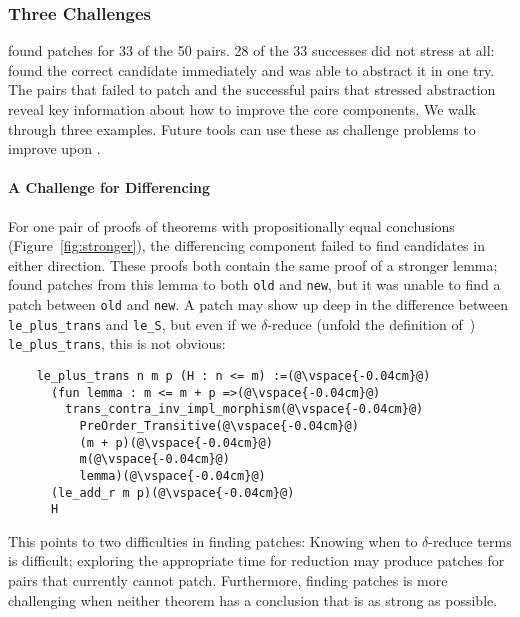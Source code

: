 \subsubsection{Three Challenges}
\label{sec:fail}

\sysname found patches for 33 of the 50 pairs. 28 of the 33 successes
did not stress \sysname at all: \sysname found the correct candidate immediately and was able to abstract it
in one try.
The pairs that \sysname failed to patch and the successful pairs that stressed abstraction
reveal key information about how to improve the core components.
We walk through three examples.
Future tools can use these as challenge problems to improve upon \sysname.

\paragraph{A Challenge for Differencing} For one pair of proofs of theorems 
with propositionally equal conclusions (Figure~\ref{fig:stronger}),
the differencing component failed to find candidates in either direction.
These proofs both contain the same proof of a stronger lemma;
\sysname found patches from this lemma to
both \lstinline{old} and \lstinline{new},
but it was unable to find a patch between \lstinline{old} and \lstinline{new}.
A patch may show up deep in the difference between \lstinline{le_plus_trans}
and \lstinline{le_S}, but even if we $\delta$-reduce (unfold the definition of~\cite{equality}) \lstinline{le_plus_trans}, this is not obvious:

\begin{lstlisting}
    le_plus_trans n m p (H : n <= m) :=(@\vspace{-0.04cm}@)
      (fun lemma : m <= m + p =>(@\vspace{-0.04cm}@)
        trans_contra_inv_impl_morphism(@\vspace{-0.04cm}@)
          PreOrder_Transitive(@\vspace{-0.04cm}@)
          (m + p)(@\vspace{-0.04cm}@)
          m(@\vspace{-0.04cm}@)
          lemma)(@\vspace{-0.04cm}@)
      (le_add_r m p)(@\vspace{-0.04cm}@)
      H
\end{lstlisting}

This points to two difficulties in finding patches: Knowing when to $\delta$-reduce terms 
is difficult; exploring the appropriate time for reduction
may produce patches for pairs that \sysname currently cannot patch.
Furthermore, finding patches is more challenging
when neither theorem has a conclusion that is as strong as possible.

